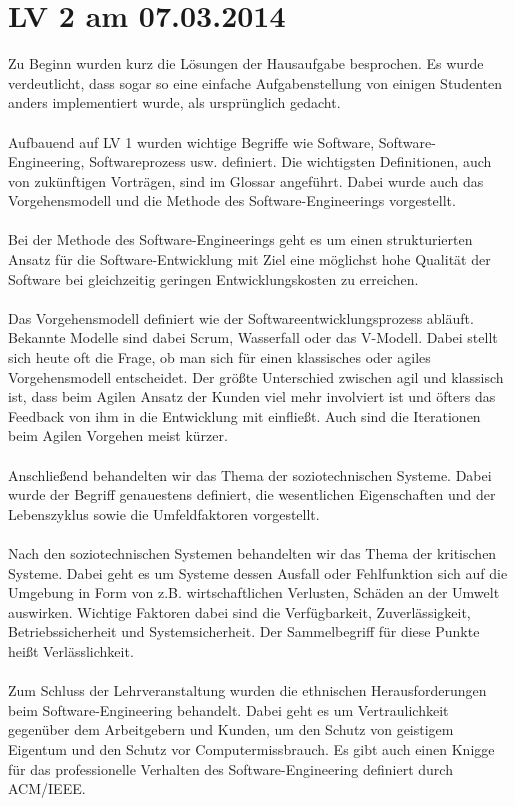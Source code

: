\chapter{LV 2 am 07.03.2014}
Zu Beginn wurden kurz die Lösungen der Hausaufgabe besprochen. Es wurde verdeutlicht, dass sogar so eine einfache Aufgabenstellung von einigen Studenten anders implementiert wurde, als ursprünglich gedacht.
\\\\
Aufbauend auf LV 1 wurden wichtige Begriffe wie Software, Software-Engineering, Softwareprozess usw. definiert. Die wichtigsten Definitionen, auch von zukünftigen Vorträgen, sind im Glossar angeführt. Dabei wurde auch das Vorgehensmodell und die Methode des Software-Engineerings vorgestellt.
\\\\
Bei der Methode des Software-Engineerings geht es um einen strukturierten Ansatz für die Software-Entwicklung mit Ziel eine möglichst hohe Qualität der Software bei gleichzeitig geringen Entwicklungskosten zu erreichen.
\\\\
Das Vorgehensmodell definiert wie der Softwareentwicklungsprozess abläuft. Bekannte Modelle sind dabei Scrum, Wasserfall oder das V-Modell. Dabei stellt sich heute oft die Frage, ob man sich für einen klassisches oder agiles Vorgehensmodell entscheidet. Der größte Unterschied zwischen agil und klassisch ist, dass beim Agilen Ansatz der Kunden viel mehr involviert ist und öfters das Feedback von ihm in die Entwicklung mit einfließt. Auch sind die Iterationen beim Agilen Vorgehen meist kürzer.
\\\\
Anschließend behandelten wir das Thema der soziotechnischen Systeme. Dabei wurde der Begriff genauestens definiert, die wesentlichen Eigenschaften und der Lebenszyklus sowie die Umfeldfaktoren vorgestellt.
\\\\
Nach den soziotechnischen Systemen behandelten wir das Thema der kritischen Systeme. Dabei geht es um Systeme dessen Ausfall oder Fehlfunktion sich auf die Umgebung in Form von z.B. wirtschaftlichen Verlusten, Schäden an der Umwelt  auswirken. Wichtige Faktoren dabei sind die Verfügbarkeit, Zuverlässigkeit, Betriebssicherheit und Systemsicherheit. Der Sammelbegriff für diese Punkte heißt Verlässlichkeit.
\\\\
Zum Schluss der Lehrveranstaltung wurden die ethnischen Herausforderungen beim Software-Engineering behandelt. Dabei geht es um Vertraulichkeit gegenüber dem Arbeitgebern und Kunden, um den Schutz von geistigem Eigentum und den Schutz vor Computermissbrauch. Es gibt auch einen Knigge für das professionelle Verhalten des Software-Engineering definiert durch ACM/IEEE.

